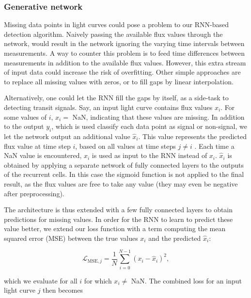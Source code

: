 \subsubsection{Generative network}
\label{sec:extension_gen}

Missing data points in light curves could pose a problem to our RNN-based detection algorithm. Naively passing the available flux values through the network, would result in the network ignoring the varying time intervals between measurements. A way to counter this problem is to feed time differences between measurements in addition to the available flux values. However, this extra stream of input data could increase the risk of overfitting. Other simple approaches are to replace all missing values with zeros, or to fill gaps by linear interpolation. 

Alternatively, one could let the RNN fill the gaps by itself, as a side-task to detecting transit signals. Say, an input light curve contains flux values $x_i$. For some values of $i$, $x_i = $ NaN, indicating that these values are missing. In addition to the output $y_i$, which is used classify each data point as signal or non-signal, we let the network output an additional value $\hat{x}_i$. This value represents the predicted flux value at time step $i$, based on all values at time steps $j \neq i$ . Each time a NaN value is encountered, $\hat{x}_i$ is used as input to the RNN instead of $x_i$. $\hat{x}_i$ is obtained by applying a separate network of fully connected layers to the outputs of the recurrent cells. In this case the sigmoid function is not applied to the final result, as the flux values are free to take any value (they may even be negative after preprocessing). 

The architecture is thus extended with a few fully connected layers to obtain predictions for missing values. In order for the RNN to learn to predict these value better, we extend our loss function with a term computing the mean squared error (MSE) between the true values $x_i$ and the predicted $\hat{x}_i$:

\begin{equation}
    \mathcal{L}_{\text{MSE}, j} = \frac{1}{N} \sum_{i=0}^{N-1} (x_i - \hat{x}_i)^2,
\end{equation}

\noindent which we evaluate for all $i$ for which $x_i \neq $ NaN. The combined loss for an input light curve $j$ then becomes 

